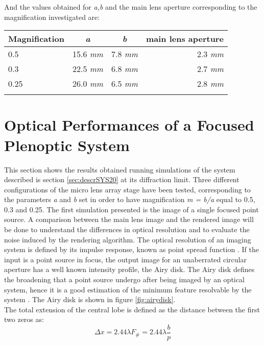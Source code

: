 And the values obtained for \textit{a,b} and the main lens aperture corresponding to the magnification investigated are:
\begin{center}
\begin{tabular}{l|c|c|r}
	\centering
	Magnification & \textit{a} & \textit{b} & main lens aperture\\ \hline
	0.5 & 15.6 \textit{mm} &  7.8 \textit{mm} & 2.3 \textit{mm}\\ \hline
    0.3 & 22.5 \textit{mm} &  6.8 \textit{mm} & 2.7 \textit{mm}\\ \hline
   	0.25 & 26.0 \textit{mm} &  6.5 \textit{mm} & 2.8 \textit{mm}\\ 
  	\label{tab:3}
\end{tabular}
\end{center}

\section{Optical Performances of a Focused Plenoptic System}
\label{sec:performances}
This section shows the results obtained running simulations of the system described is section \ref{sec:descrSYS20} at its diffraction limit. Three different configurations of the micro lens array stage have been tested, corresponding to the parameters \textit{a} and \textit{b} set in order to have magnification \textit{m = b/a} equal to 0.5, 0.3 and 0.25.
The first simulation presented is the image of a single focused point source. A comparison between the main lens image and the rendered image will be done to understand the differences in optical resolution and to evaluate the noise induced by the rendering algorithm.
The optical resolution of an imaging system is defined by its impulse response, known as point spread function \cite{goodman2005introduction,pedrotti1993introduction}. If the input is a point source in focus, the output image for an unaberrated circular aperture has a well known intensity profile, the Airy disk. The Airy disk defines the broadening that a point source undergo after being imaged by an optical system, hence it is a good estimation of the minimum feature resolvable by the system \cite{goodman2005introduction,herzig1997micro}. The Airy disk is shown in figure \ref{fig:airydisk}.  \\
The total extension of the central lobe is defined as the distance between the first two zeros as:
\begin{equation}
	\label{eq:airy3}
	\Delta x = 2.44 \lambda F_\# = 2.44 \lambda \dfrac{b}{p}
\end{equation}

